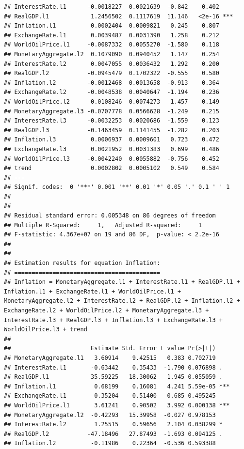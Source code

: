 \documentclass[11pt,preprint, authoryear]{elsarticle}
\numberwithin{equation}{section}
\numberwithin{figure}{section}
\numberwithin{table}{section}
\begin{document}
\begin{verbatim}
## InterestRate.l1      -0.0018227  0.0021639  -0.842    0.402    
## RealGDP.l1            1.2456502  0.1117619  11.146   <2e-16 ***
## Inflation.l1          0.0002404  0.0009821   0.245    0.807    
## ExchangeRate.l1       0.0039487  0.0031390   1.258    0.212    
## WorldOilPrice.l1     -0.0087332  0.0055270  -1.580    0.118    
## MonetaryAggregate.l2  0.1079090  0.0940452   1.147    0.254    
## InterestRate.l2       0.0047055  0.0036432   1.292    0.200    
## RealGDP.l2           -0.0945479  0.1702322  -0.555    0.580    
## Inflation.l2         -0.0012468  0.0013658  -0.913    0.364    
## ExchangeRate.l2      -0.0048538  0.0040647  -1.194    0.236    
## WorldOilPrice.l2      0.0108246  0.0074273   1.457    0.149    
## MonetaryAggregate.l3 -0.0707778  0.0566628  -1.249    0.215    
## InterestRate.l3      -0.0032253  0.0020686  -1.559    0.123    
## RealGDP.l3           -0.1463459  0.1141455  -1.282    0.203    
## Inflation.l3          0.0006937  0.0009601   0.723    0.472    
## ExchangeRate.l3       0.0021952  0.0031383   0.699    0.486    
## WorldOilPrice.l3     -0.0042240  0.0055882  -0.756    0.452    
## trend                 0.0002802  0.0005102   0.549    0.584    
## ---
## Signif. codes:  0 '***' 0.001 '**' 0.01 '*' 0.05 '.' 0.1 ' ' 1
## 
## 
## Residual standard error: 0.005348 on 86 degrees of freedom
## Multiple R-Squared:     1,   Adjusted R-squared:     1 
## F-statistic: 4.367e+07 on 19 and 86 DF,  p-value: < 2.2e-16 
## 
## 
## Estimation results for equation Inflation: 
## ========================================== 
## Inflation = MonetaryAggregate.l1 + InterestRate.l1 + RealGDP.l1 + Inflation.l1 + ExchangeRate.l1 + WorldOilPrice.l1 + MonetaryAggregate.l2 + InterestRate.l2 + RealGDP.l2 + Inflation.l2 + ExchangeRate.l2 + WorldOilPrice.l2 + MonetaryAggregate.l3 + InterestRate.l3 + RealGDP.l3 + Inflation.l3 + ExchangeRate.l3 + WorldOilPrice.l3 + trend 
## 
##                       Estimate Std. Error t value Pr(>|t|)    
## MonetaryAggregate.l1   3.60914    9.42515   0.383 0.702719    
## InterestRate.l1       -0.63442    0.35433  -1.790 0.076898 .  
## RealGDP.l1            35.59225   18.30062   1.945 0.055059 .  
## Inflation.l1           0.68199    0.16081   4.241 5.59e-05 ***
## ExchangeRate.l1        0.35204    0.51400   0.685 0.495245    
## WorldOilPrice.l1       3.61241    0.90502   3.992 0.000138 ***
## MonetaryAggregate.l2  -0.42293   15.39958  -0.027 0.978153    
## InterestRate.l2        1.25515    0.59656   2.104 0.038299 *  
## RealGDP.l2           -47.18496   27.87493  -1.693 0.094125 .  
## Inflation.l2          -0.11986    0.22364  -0.536 0.593388    

\end{verbatim}
\end{document}
